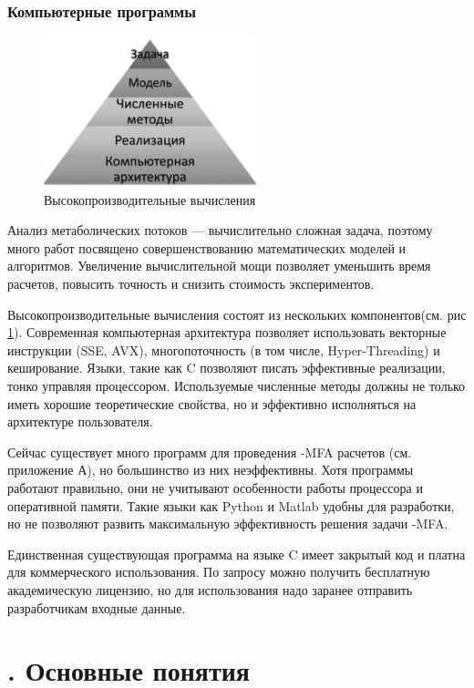 \documentclass[14pt, a4paper]{extreport}
\newcommand{\CC}{C\nolinebreak\hspace{-.05em}\raisebox{.4ex}{\tiny\bf +}\nolinebreak\hspace{-.10em}\raisebox{.4ex}{\tiny\bf +}}
\def\CC{{C\nolinebreak[4]\hspace{-.05em}\raisebox{.4ex}{\tiny\bf ++}}} %
\begin{document}
\clearpage
\subsection{Компьютерные программы}
\begin{figure}[b]
	\centering
	\includegraphics[width=0.55\textwidth]{hpc.png}\par
	\caption{Высокопроизводительные вычисления}
	\label{hpc}
\end{figure}
Анализ метаболических потоков --- вычислительно сложная задача, поэтому много работ посвящено совершенствованию математических моделей и алгоритмов. Увеличение вычислительной мощи позволяет уменьшить время расчетов, повысить точность и снизить стоимость экспериментов.

Высокопроизводительные вычисления состоят из нескольких компонентов(см. рис \ref{hpc}). Современная компьютерная архитектура позволяет использовать векторные инструкции (SSE, AVX), многопоточность (в том числе, Hyper-Threading) и кеширование. Языки, такие как \CC{} позволяют писать эффективные реализации, тонко управляя процессором. Используемые численные методы должны не только иметь хорошие теоретические свойства, но и эффективно исполняться на архитектуре пользователя.

Сейчас существует много программ для проведения -MFA расчетов (см. приложение А), но большинство из них неэффективны. Хотя программы работают правильно, они не учитывают особенности работы процессора и оперативной памяти. Такие языки как Python и Matlab удобны для разработки, но не позволяют развить максимальную эффективность решения задачи -MFA.

Единственная существующая программа на языке \CC{} имеет закрытый код и платна для коммерческого использования. По запросу можно получить бесплатную академическую лицензию, но для использования надо заранее отправить разработчикам входные данные.

\chapter[Основные понятия]{\thechapter{}. Основные понятия}
\end{document}
